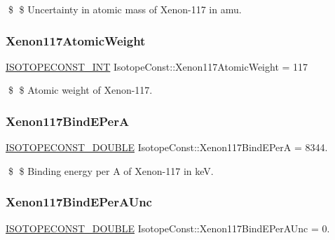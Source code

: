 \$ \$ Uncertainty in atomic mass of Xenon-\/117 in amu. \mbox{\label{group___isotope_const-_xenon-_xe117_ga86eddec4dbd651d12638336e412f9eea}} 
\subsubsection{\texorpdfstring{Xenon117\+Atomic\+Weight}{Xenon117AtomicWeight}}
{\footnotesize\ttfamily \mbox{\hyperlink{group___isotope_const-_macros_ga5f18360b3e99483a35c32d789e62621c}{I\+S\+O\+T\+O\+P\+E\+C\+O\+N\+S\+T\+\_\+\+I\+NT}} Isotope\+Const\+::\+Xenon117\+Atomic\+Weight = 117}

\$ \$ Atomic weight of Xenon-\/117. \mbox{\label{group___isotope_const-_xenon-_xe117_ga915a48b0e2f1d1f2400475e6e8b67e69}} 
\subsubsection{\texorpdfstring{Xenon117\+Bind\+E\+PerA}{Xenon117BindEPerA}}
{\footnotesize\ttfamily \mbox{\hyperlink{group___isotope_const-_macros_ga8f45a7272ce02c0b4c65c44636ed719a}{I\+S\+O\+T\+O\+P\+E\+C\+O\+N\+S\+T\+\_\+\+D\+O\+U\+B\+LE}} Isotope\+Const\+::\+Xenon117\+Bind\+E\+PerA = 8344.}

\$ \$ Binding energy per A of Xenon-\/117 in keV. \mbox{\label{group___isotope_const-_xenon-_xe117_gaf0e62a2f740ac85bfc33cde7a83ff39b}} 
\subsubsection{\texorpdfstring{Xenon117\+Bind\+E\+Per\+A\+Unc}{Xenon117BindEPerAUnc}}
{\footnotesize\ttfamily \mbox{\hyperlink{group___isotope_const-_macros_ga8f45a7272ce02c0b4c65c44636ed719a}{I\+S\+O\+T\+O\+P\+E\+C\+O\+N\+S\+T\+\_\+\+D\+O\+U\+B\+LE}} Isotope\+Const\+::\+Xenon117\+Bind\+E\+Per\+A\+Unc = 0.}

